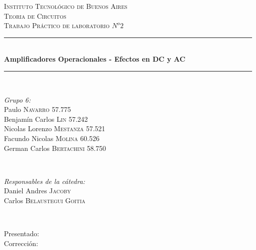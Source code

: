 \begin{titlepage}
\newcommand{\HRule}{\rule{\linewidth}{0.5mm}}
\center
\textsc{\LARGE Instituto Tecnológico de Buenos Aires}\\[1.5cm]
\textsc{\Large Teoria de Circuitos}\\[0.5cm]
\textsc{\large Trabajo Práctico de laboratorio $N^o2$}\\[0.5cm]

\HRule \\[0.4cm]
{ \huge \bfseries Amplificadores Operacionales - Efectos en DC y AC}\\[0.1cm] %
\HRule \\[1.5cm]

\begin{minipage}{0.4\textwidth}
\begin{flushleft} \large
\emph{Grupo 6:}\\
Paulo \textsc{Navarro} 57.775\\
Benjamín Carlos \textsc{Lin} 57.242\\
Nicolas Lorenzo  \textsc{Mestanza} 57.521\\
Facundo Nicolas \textsc{Molina} 60.526\\
German Carlos  \textsc{Bertachini} 58.750\\
\end{flushleft}
\end{minipage}
~
\begin{minipage}{0.4\textwidth}
\begin{flushright} \large
\emph{Responsables de la cátedra:} \\
Daniel Andres \textsc{Jacoby}\\
Carlos \textsc{Belaustegui Goitia}\\

\end{flushright}
\end{minipage}\\[4cm]

\begin{minipage}{0.4\textwidth}
\begin{flushleft} \large
Presentado: \\
Corrección:\\
\end{flushleft}
\end{minipage}
\vfill %

\end{titlepage}
